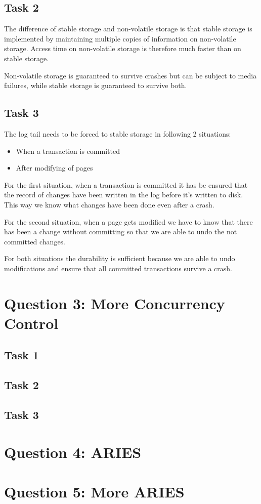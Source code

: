 \documentclass[12pt,a4paper]{article}
\begin{document}
\subsection{Task 2}
The difference of stable storage and non-volatile storage is that stable storage is implemented by maintaining multiple copies of information on non-volatile storage.
Access time on non-volatile storage is therefore much faster than on stable storage.

Non-volatile storage is guaranteed to survive crashes but can be subject to media failures, while stable storage is guaranteed to survive both.


\subsection{Task 3}
The log tail needs to be forced to stable storage in following 2 situations:
\begin{itemize}
	\item When a transaction is committed
	\item After modifying of pages	
\end{itemize}

For the first situation, when a transaction is committed it has be ensured that the record of changes have been written in the log before it's written to disk.
This way we know what changes have been done even after a crash.

For the second situation, when a page gets modified we have to know that there has been a change without committing so that we are able to undo the not committed changes. 

For both situations the durability is sufficient because we are able to undo modifications and ensure that all committed transactions survive a crash.

\section{Question 3: More Concurrency Control}
\subsection{Task 1}
\subsection{Task 2}
\subsection{Task 3}

\section{Question 4: ARIES}

\section{Question 5: More ARIES}
\end{document}
